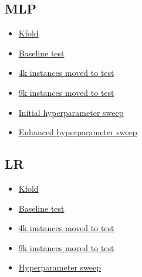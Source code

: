 \documentclass[11pt]{article}
\begin{document}
\subsection{MLP}
\begin{itemize}
  \item \href{https://wandb.ai/supervisedlearning/MLP%20all%20Kfolds/experiments?}{Kfold}
  \item \href{https://wandb.ai/supervisedlearning/MLP%20all%20test%20set%20experiments?}{Baseline test}
  \item \href{https://wandb.ai/supervisedlearning/MLP%20all%204000%20moved%20to%20test%20experiments?}{4k instances moved to test}
  \item \href{https://wandb.ai/supervisedlearning/MLP%20all%209000%20moved%20to%20test%20experiments?}{9k instances moved to test}
  \item \href{https://wandb.ai/supervisedlearning/MLP-sweeps/sweeps/aum1y9nw?workspace=user-samfh}{Initial hyperparameter sweep}
  \item \href{https://wandb.ai/supervisedlearning/MLP-sweeps/sweeps/ha5qixd1?workspace=user-samfh}{Enhanced hyperparameter sweep}
\end{itemize}

\subsection{LR}
\begin{itemize}
  \item \href{https://wandb.ai/supervisedlearning/LR%20all%20Kfolds?workspace=user-dardric}{Kfold}
  \item \href{https://wandb.ai/supervisedlearning/LR%20all%20test%20set%20experiments?workspace=user-dardric}{Baseline test}
  \item \href{https://wandb.ai/supervisedlearning/LR%20all%204000%20moved%20to%20test%20experiments?workspace=user-dardric}{4k instances moved to test}
  \item \href{https://wandb.ai/supervisedlearning/LR%20all%209000%20moved%20to%20test%20experiments?workspace=user-dardric}{9k instances moved to test}
  \item \href{https://wandb.ai/supervisedlearning/LC-sweeps/sweeps/409bnuc6?workspace=user-dardric}{Hyperparameter sweep}
\end{itemize}
\end{document}

